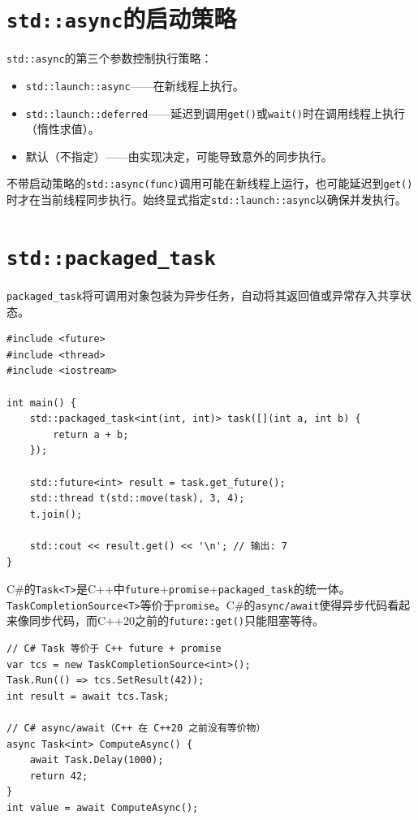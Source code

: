 \documentclass[12pt,a4paper,fontset=fandol]{ctexbook}
\newcommand{\cpp}[1]{C++#1}
\newcommand{\csharp}{C\#}
\begin{document}
\section{\texttt{std::async}的启动策略}

\texttt{std::async}的第三个参数控制执行策略：

\begin{itemize}[nosep]
\item \texttt{std::launch::async}——在新线程上执行。
\item \texttt{std::launch::deferred}——延迟到调用\texttt{get()}或\texttt{wait()}时在调用线程上执行（惰性求值）。
\item 默认（不指定）——由实现决定，可能导致意外的同步执行。
\end{itemize}

\begin{warning}
不带启动策略的\texttt{std::async(func)}调用可能在新线程上运行，也可能延迟到\texttt{get()}时才在当前线程同步执行。始终显式指定\texttt{std::launch::async}以确保并发执行。
\end{warning}

\section{\texttt{std::packaged\_task}}

\texttt{packaged\_task}将可调用对象包装为异步任务，自动将其返回值或异常存入共享状态。

\begin{lstlisting}
#include <future>
#include <thread>
#include <iostream>

int main() {
    std::packaged_task<int(int, int)> task([](int a, int b) {
        return a + b;
    });

    std::future<int> result = task.get_future();
    std::thread t(std::move(task), 3, 4);
    t.join();

    std::cout << result.get() << '\n'; // 输出: 7
}
\end{lstlisting}

\begin{compare}
\csharp{}的\texttt{Task<T>}是\cpp{}中\texttt{future}+\texttt{promise}+\texttt{packaged\_\allowbreak{}task}的统一体。\texttt{Task\allowbreak{}Completion\allowbreak{}Source<T>}等价于\texttt{promise}。\csharp{}的\texttt{async/await}使得异步代码看起来像同步代码，而\cpp{}20之前的\texttt{future::get()}只能阻塞等待。

\begin{lstlisting}[style=csharpstyle]
// C# Task 等价于 C++ future + promise
var tcs = new TaskCompletionSource<int>();
Task.Run(() => tcs.SetResult(42));
int result = await tcs.Task;

// C# async/await（C++ 在 C++20 之前没有等价物）
async Task<int> ComputeAsync() {
    await Task.Delay(1000);
    return 42;
}
int value = await ComputeAsync();
\end{lstlisting}
\end{compare}
\end{document}
